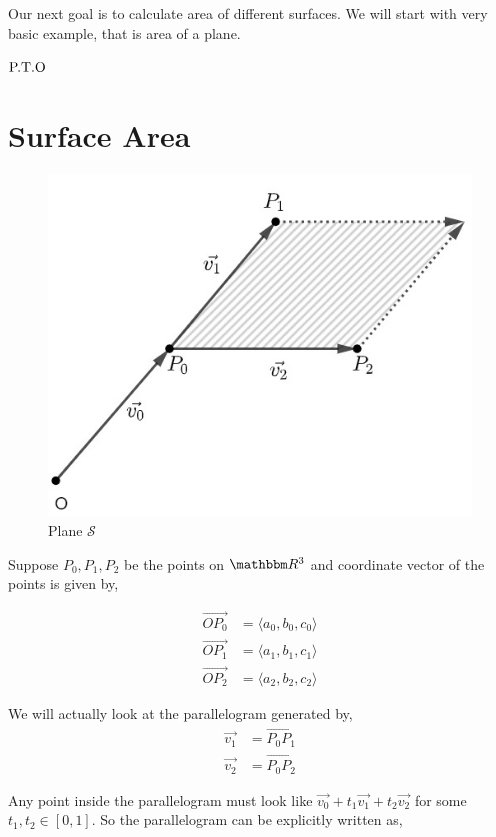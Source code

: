 \documentclass[../Analysis-3]{subfiles}
\begin{document}
Our next goal is to calculate area of different surfaces. We will start with very basic example, that is area of a plane.

\vfill
$\hfill \text{P.T.O}$

\pagebreak

\section{Surface Area} \label{marker}

\begin{figure}
    \centering
    \includegraphics[width=.78\linewidth]{../figures/lec-25.1.png}
    \caption{Plane $\mathcal{S}$}
\end{figure}

Suppose $P_0,P_1,P_2$ be the points on $\R^3$ and coordinate vector of the points is given by,

\begin{align*}
    \vec{OP_0} & = \langle a_0,b_0,c_0 \rangle \\
    \vec{OP_1} & = \langle a_1,b_1,c_1 \rangle \\
    \vec{OP_2} & = \langle a_2,b_2,c_2 \rangle
\end{align*}

We will actually look at the parallelogram generated by,
\begin{align*}
    \vec{v_1} & = \vec{P_0P_1} \\
    \vec{v_2} & = \vec{P_0P_2}
\end{align*}

Any point inside the parallelogram must look like $\vec{v_0} + t_1 \vec{v_1} +t_2 \vec{v_2}$ for some $t_1,t_2 \in [0,1]$. So the parallelogram can be explicitly written as,
\end{document}
